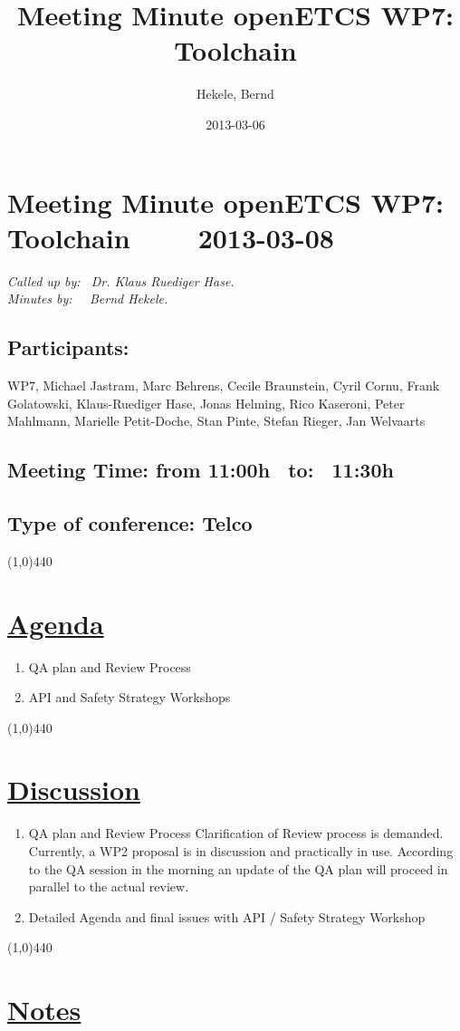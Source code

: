 \documentclass[a4paper]{article}
\title{Meeting Minute openETCS WP7: Toolchain}
\author{Hekele, Bernd}
\date{2013-03-06}
\begin{document}
\section*{\large{Meeting Minute openETCS WP7: Toolchain \ \ \ \ 2013-03-08}}

\emph{Called up by: \ Dr. Klaus Ruediger Hase.}\\
\emph{Minutes by: \ \  Bernd Hekele.}

\subsection*{Participants:} WP7, 
Michael Jastram, 
Marc Behrens, 
Cecile Braunstein,
Cyril Cornu, 
Frank Golatowski, 
Klaus-Ruediger Hase, 
Jonas Helming,
Rico Kaseroni, 
Peter Mahlmann, 
Marielle Petit-Doche, 
Stan Pinte, 
Stefan Rieger, 
Jan Welvaarts\\


\subsection*{Meeting Time: from 11:00h \ to: \ 11:30h}

\subsection*{Type of conference: Telco}

\line(1,0){440}
\section*{\underline{Agenda}}
\begin{enumerate}
\item QA plan and Review Process 
\item API and Safety Strategy Workshops
\end{enumerate}
\line(1,0){440}
\section*{\underline{Discussion}}

\begin{enumerate}

\item QA plan and Review Process
Clarification of Review process is demanded. Currently, a WP2 proposal is in discussion and practically in use. According to the QA session in the morning an update of the QA plan will proceed in parallel to the actual review.\\
\item Detailed Agenda and final issues with API / Safety Strategy Workshop\newline

\end{enumerate}

\line(1,0){440}
\section*{\underline{Notes}}
\end{document}
